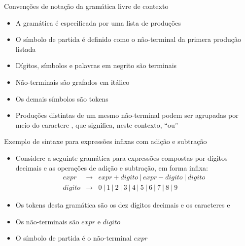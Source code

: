 \begin{frame}[fragile]{Convenções de notação da gramática livre de contexto}

    \begin{itemize}
        \item A gramática é especificada por uma lista de produções

        \item O símbolo de partida é definido como o não-terminal da primera produção listada

        \item Dígitos, símbolos e palavras em negrito são terminais

        \item Não-terminais são grafados em itálico

        \item Os demais símbolos são tokens

        \item Produções distintas de um mesmo não-terminal podem ser agrupadas por meio do caractere , que significa, neste contexto, ``ou''
    \end{itemize}

\end{frame}

\begin{frame}[fragile]{Exemplo de sintaxe para expressões infixas com adição e subtração}

    \begin{itemize}
        \item Considere a seguinte gramática para expressões compostas por dígitos decimais e as operações de adição e subtração, em forma infixa:
    \[
        \begin{array}{rcl}
            expr & \to & expr + digito\ |\ expr - digito\ |\ digito \\
            digito & \to & 0 \ | \  1 \ | \  2 \ | \  3 \ | \  4 \ | \  5 \ | \  6 \ | \  7 \ | \  8 \ | \  9
        \end{array}
    \]

        \item Os tokens desta gramática são os dez dígitos decimais e os caracteres  e 

        \item Os não-terminais são $expr$ e $digito$

        \item O símbolo de partida é o não-terminal $expr$
    \end{itemize}

\end{frame}

